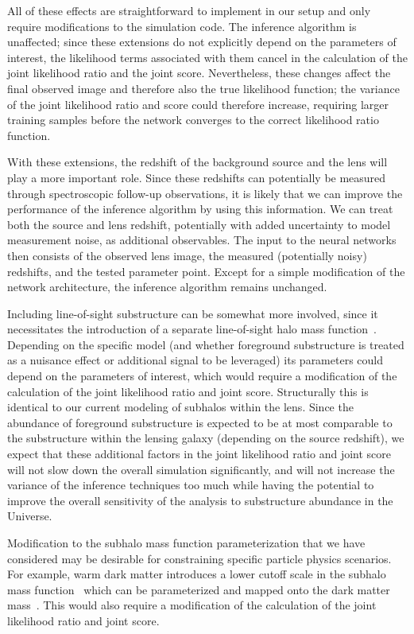 \documentclass[twocolumn]{aastex62}
\begin{document}
All of these effects are straightforward to implement in our setup and only require modifications to the simulation code. The inference algorithm is unaffected; since these extensions do not explicitly depend on the parameters of interest, the likelihood terms associated with them cancel in the calculation of the joint likelihood ratio and the joint score. Nevertheless, these changes affect the final observed image and therefore also the true likelihood function; the variance of the joint likelihood ratio and score could therefore increase, requiring larger training samples before the network converges to the correct likelihood ratio function.

With these extensions, the redshift of the background source and the lens will play a more important role. Since these redshifts can potentially be measured through spectroscopic follow-up observations, it is likely that we can improve the performance of the inference algorithm by using this information. We can treat both the source and lens redshift, potentially with added uncertainty to model measurement noise, as additional observables. The input to the neural networks then consists of the observed lens image, the measured (potentially noisy) redshifts, and the tested parameter point. Except for a simple modification of the network architecture, the inference algorithm remains unchanged.

Including line-of-sight substructure can be somewhat more involved, since it necessitates the introduction of a separate line-of-sight halo mass function~\citep{1610.01599,1710.05029,1901.11031,2019arXiv190504182H}. Depending on the specific model (and whether foreground substructure is treated as a nuisance effect or additional signal to be leveraged) its parameters could depend on the parameters of interest, which would require a modification of the calculation of the joint likelihood ratio and joint score. Structurally this is identical to our current modeling of subhalos within the lens. Since the abundance of foreground substructure is expected to be at most comparable to the substructure within the lensing galaxy (depending on the source redshift), we expect that these additional factors in the joint likelihood ratio and joint score will not slow down the overall simulation significantly, and will not increase the variance of the inference techniques too much while having the potential to improve the overall sensitivity of the analysis to substructure abundance in the Universe.

Modification to the subhalo mass function parameterization that we have considered may be desirable for constraining specific particle physics scenarios. For example, warm dark matter introduces a lower cutoff scale in the subhalo mass function~\citep{2001ApJ...556...93B} which can be parameterized and mapped onto the dark matter mass~\citep{1308.1399,1112.0330,1702.00009,1512.06507}. This would also require a modification of the calculation of the joint likelihood ratio and joint score.
\end{document}
